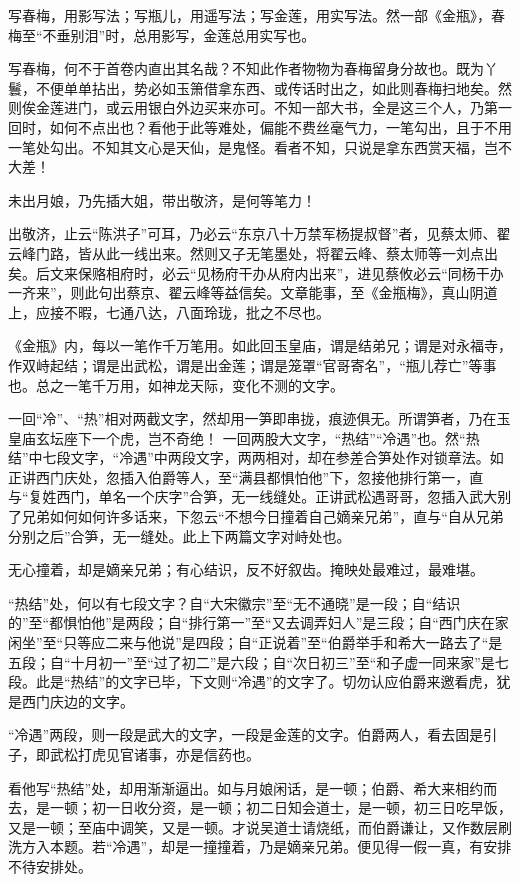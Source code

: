 \begin{showcontents}{}
{写春梅，用影写法；写瓶儿，用遥写法；写金莲，用实写法。然一部《金瓶》，春梅至“不垂别泪”时，总用影写，金莲总用实写也。

写春梅，何不于首卷内直出其名哉？不知此作者物物为春梅留身分故也。既为丫鬟，不便单单拈出，势必如玉箫借拿东西、或传话时出之，如此则春梅扫地矣。然则俟金莲进门，或云用银白外边买来亦可。不知一部大书，全是这三个人，乃第一回时，如何不点出也？看他于此等难处，偏能不费丝毫气力，一笔勾出，且于不用一笔处勾出。不知其文心是天仙，是鬼怪。看者不知，只说是拿东西赏天福，岂不大差！

未出月娘，乃先插大姐，带出敬济，是何等笔力！

出敬济，止云“陈洪子”可耳，乃必云“东京八十万禁军杨提叔督”者，见蔡太师、翟云峰门路，皆从此一线出来。然则又子无笔墨处，将翟云峰、蔡太师等一刘点出矣。后文来保赂相府时，必云“见杨府干办从府内出来”，进见蔡攸必云“同杨干办一齐来”，则此句出蔡京、翟云峰等益信矣。文章能事，至《金瓶梅》，真山阴道上，应接不暇，七通八达，八面玲珑，批之不尽也。

《金瓶》内，每以一笔作千万笔用。如此回玉皇庙，谓是结弟兄；谓是对永福寺，作双峙起结；谓是出武松，谓是出金莲；谓是笼罩“官哥寄名”，“瓶儿荐亡”等事也。总之一笔千万用，如神龙天际，变化不测的文字。

一回“冷”、“热”相对两截文字，然却用一笋即串拢，痕迹俱无。所谓笋者，乃在玉皇庙玄坛座下一个虎，岂不奇绝！
一回两股大文字，“热结”“冷遇”也。然“热结”中七段文字，“冷遇”中两段文字，两两相对，却在参差合笋处作对锁章法。如正讲西门庆处，忽插入伯爵等人，至“满县都惧怕他”下，忽接他排行第一，直与“复姓西门，单名一个庆字”合笋，无一线缝处。正讲武松遇哥哥，忽插入武大别了兄弟如何如何许多话来，下忽云“不想今日撞着自己嫡亲兄弟”，直与“自从兄弟分别之后”合笋，无一缝处。此上下两篇文字对峙处也。

无心撞着，却是嫡亲兄弟；有心结识，反不好叙齿。掩映处最难过，最难堪。

“热结”处，何以有七段文字？自“大宋徽宗”至“无不通晓”是一段；自“结识的”至“都惧怕他”是两段；自“排行第一”至“又去调弄妇人”是三段；自“西门庆在家闲坐”至“只等应二来与他说”是四段；自“正说着”至“伯爵举手和希大一路去了“是五段；自“十月初一”至“过了初二”是六段；自“次日初三”至“和子虚一同来家”是七段。此是“热结”的文字已毕，下文则“冷遇”的文字了。切勿认应伯爵来邀看虎，犹是西门庆边的文字。

“冷遇”两段，则一段是武大的文字，一段是金莲的文字。伯爵两人，看去固是引子，即武松打虎见官诸事，亦是信药也。

看他写“热结”处，却用渐渐逼出。如与月娘闲话，是一顿；伯爵、希大来相约而去，是一顿；初一日收分资，是一顿；初二日知会道士，是一顿，初三日吃早饭，又是一顿；至庙中调笑，又是一顿。才说吴道士请烧纸，而伯爵谦让，又作数层刷洗方入本题。若“冷遇”，却是一撞撞着，乃是嫡亲兄弟。便见得一假一真，有安排不待安排处。

}
\end{showcontents}
